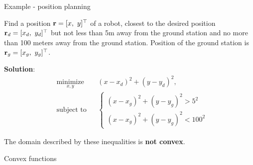 \documentclass{beamer}
\begin{document}
\begin{frame}{Example - position planning}
	\begin{flushleft}
		
		Find a position $\bo{r} = [x, \ y]\T$ of a robot, closest to the desired position $\mathbf{r}_d= [x_d, \ y_d]^\top$ but \textcolor{mydarkred}{not less than 5m away from the ground station and no more than 100 meters away from the ground station.} Position of the ground station is $\mathbf{r}_g= [x_g, \ y_g]^\top$.
		
		\bigskip
		
		\textbf{Solution}:
		\begin{equation}
			\begin{aligned}
				& \underset{x, y}{\text{minimize}}
				& & (x-x_d)^2 + (y-y_d)^2, \\
				& \text{subject to}
				& & \begin{cases}
					(x-x_g)^2 + (y-y_g)^2 > 5^2 \\
					(x-x_g)^2 + (y-y_g)^2 < 100^2
				\end{cases}
			\end{aligned}
		\end{equation}
		
		The domain described by these inequalities is \textbf{not convex}.
		
	\end{flushleft}
\end{frame}




\begin{frame}
		\centerline{\huge Convex functions}
\end{frame}
\end{document}
